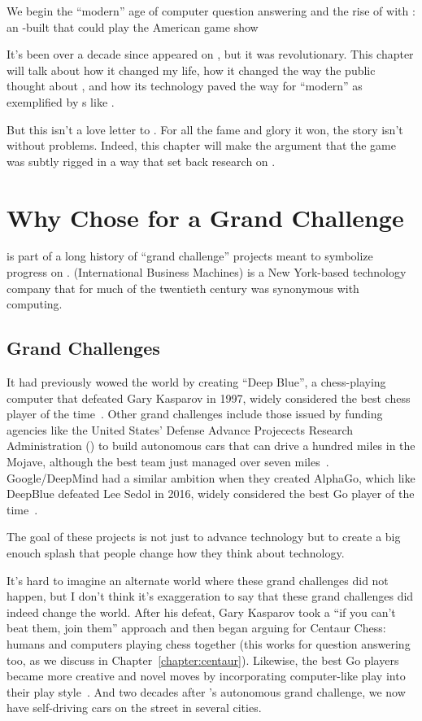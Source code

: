 
We begin the ``modern'' age of computer question answering and the rise of
 with \watson{}: an -built  that could play the
American game show \jeopardyf{}

It's been over a decade since \watson{} appeared on , but it was
revolutionary.  This chapter will talk about how it changed my life, how it
changed the way the public thought about , and how its technology
paved the way for ``modern''  as exemplified by \mm{}s like .

But this isn't a love letter to \watson{}.  For all the fame and glory it won, the
\watson{} story isn't without problems.  Indeed, this chapter will make the
argument that the game was subtly rigged in a way that set back research on
.

\section{Why  Chose \jeopardy{} for a Grand Challenge}

\watson{} is part of a long history of ``grand challenge'' projects meant to
symbolize progress on .
%
 (International Business Machines) is a New York-based technology
company that for much of the twentieth century was synonymous with computing.

\subsection{Grand Challenges}
\label{sec:grand-challenge}

It had previously wowed the world by creating ``Deep Blue'', a chess-playing
computer that defeated Gary Kasparov in 1997, widely considered the best chess
player of the time~\citep{hsu-02}.
%
Other  grand challenges include those issued by funding agencies like
the United States' Defense Advance Projecects Research Administration
() to build autonomous cars that can drive a hundred miles
in the Mojave, although the best team just managed over seven miles~\citep{patterson-05}.
%
Google/DeepMind had a similar ambition when they created AlphaGo, which like
DeepBlue defeated Lee Sedol in 2016, widely considered the best Go player of the time~\citep{koch-16}.

The goal of these projects is not just to advance technology but to create a
big enouch splash that people change how they think about technology.

It's hard to imagine an alternate world where these grand challenges did not
happen, but I don't think it's exaggeration to say that these grand challenges
did indeed change the world.  
%
After his defeat, Gary Kasparov took a ``if you can't beat them, join them''
approach and then began arguing for Centaur Chess: humans and computers
playing chess together (this works for question answering too, as we discuss
in Chapter~\ref{chapter:centaur}).
%
Likewise, the best Go players became more creative and novel moves by 
incorporating computer-like play into their play style~\cite{shin-23}.
%
And two decades after 's autonomous grand challenge, we now have
self-driving cars on the street in several  cities.

